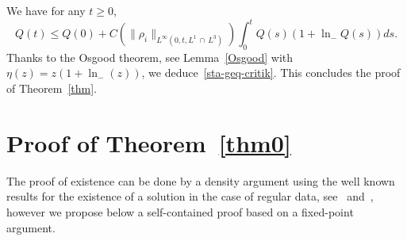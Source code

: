 \documentclass[AHL,Unicode,longabstracts,published]{cedram}
\renewcommand{\leq}{\leqslant}
\renewcommand{\geq}{\geqslant}
\begin{document}
We have for any $t\geq 0$,
\begin{equation*}
Q(t) \leq Q(0)+ C\left(\|\rho_i\|_{L^\infty\left(0,t, L^1\,\cap \,L^3\right)}\right)\int_0^t Q(s)(1+\ln_{-} Q(s)) ds.
\end{equation*}
Thanks to the Osgood theorem, see Lemma~\ref{Osgood} with $\eta(z)=z(1+\ln_{-}(z)) $, we deduce~\eqref{sta-geq-critik}. This concludes the proof of Theorem~\ref{thm}.



\section{Proof of Theorem~\ref{thm0}}\label{sec-proof-princi}


The proof of existence can be done by a density argument using the well known results for the existence of a solution in the case of regular data, see~\cite{Hofer} and~\cite{Mecherbet2}, however we propose below a self-contained proof based on a fixed-point argument.
\end{document}
